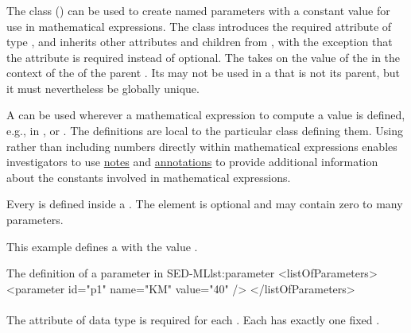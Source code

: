 \subsubsection{}
\label{class:parameter}
The  class () can be used to create named parameters with a constant value for use in mathematical expressions.
The  class introduces the required attribute \hyperref[sec:value]{} of type , and inherits other attributes and children from \SEDBase, with the exception that the attribute  is required instead of optional.  The  takes on the value of the  in the context of the \Math of the parent \Calculation.  Its  may not be used in a \Calculation that is not its parent, but it must nevertheless be globally unique.


A \Parameter can be used wherever a mathematical expression to compute a value is defined, e.g., in \ComputeChange, \FunctionalRange or \DataGenerator. The \Parameter definitions are local to the particular class defining them. Using  rather than including numbers directly within mathematical expressions enables investigators to use \hyperref[class:notes]{notes} and \hyperref[class:annotation]{annotations} to provide additional information about the constants involved in mathematical expressions.

Every \Parameter is defined inside a \ListOfParameters.  The element is optional and may contain zero to many parameters.

This example defines a   with the value . 
\begin{myXmlLst}{The definition of a parameter in SED-ML}{lst:parameter}
<listOfParameters>
	<parameter id="p1" name="KM" value="40" />
</listOfParameters>
\end{myXmlLst}


\paragraph*{}
\label{sec:value}
The  attribute of data type  is required for each \Parameter. Each \Parameter has exactly one fixed .

